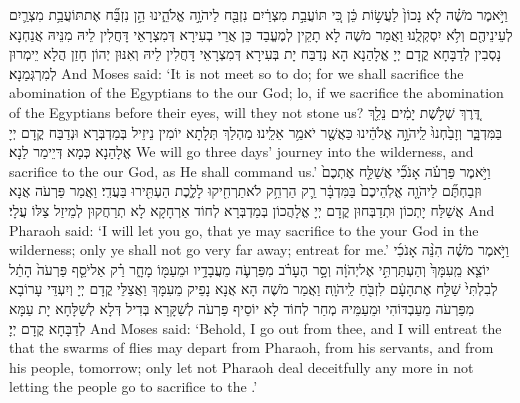 {וַיֹּ֣אמֶר מֹשֶׁ֗ה לֹ֤א נָכוֹן֙ לַעֲשׂ֣וֹת כֵּ֔ן כִּ֚י תּוֹעֲבַ֣ת מִצְרַ֔יִם נִזְבַּ֖ח לַיהֹוָ֣ה אֱלֹהֵ֑ינוּ הֵ֣ן נִזְבַּ֞ח אֶת\maqqaf תּוֹעֲבַ֥ת מִצְרַ֛יִם לְעֵינֵיהֶ֖ם וְלֹ֥א יִסְקְלֻֽנוּ׃}
{וַאֲמַר מֹשֶׁה לָא תָקֵין לְמֶעֱבַד כֵּן אֲרֵי בְעִירָא דְּמִצְרָאֵי דָּחֲלִין לֵיהּ מִנֵּיהּ אֲנַחְנָא נָסְבִין לְדַבָּחָא קֳדָם יְיָ אֱלָהַנָא הָא נְדַבַּח יָת בְּעִירָא דְּמִצְרָאֵי דָּחֲלִין לֵיהּ וְאִנּוּן יְהוֹן חָזַן הֲלָא יֵימְרוּן לְמִרְגְּמַנָא׃}
{And Moses said: ‘It is not meet so to do; for we shall sacrifice the abomination of the Egyptians to the \lord\space our God; lo, if we sacrifice the abomination of the Egyptians before their eyes, will they not stone us?}{}
{דֶּ֚רֶךְ שְׁלֹ֣שֶׁת יָמִ֔ים נֵלֵ֖ךְ בַּמִּדְבָּ֑ר וְזָבַ֙חְנוּ֙ לַֽיהֹוָ֣ה אֱלֹהֵ֔ינוּ כַּאֲשֶׁ֖ר יֹאמַ֥ר אֵלֵֽינוּ׃}
{מַהְלַךְ תְּלָתָא יוֹמִין נֵיזֵיל בְּמַדְבְּרָא וּנְדַבַּח קֳדָם יְיָ אֱלָהַנָא כְּמָא דְּיֵימַר לַנָא׃}
{We will go three days’ journey into the wilderness, and sacrifice to the \lord\space our God, as He shall command us.’}{}
{וַיֹּ֣אמֶר פַּרְעֹ֗ה אָנֹכִ֞י אֲשַׁלַּ֤ח אֶתְכֶם֙ וּזְבַחְתֶּ֞ם לַיהֹוָ֤ה אֱלֹֽהֵיכֶם֙ בַּמִּדְבָּ֔ר רַ֛ק הַרְחֵ֥ק לֹא\maqqaf תַרְחִ֖יקוּ לָלֶ֑כֶת הַעְתִּ֖ירוּ בַּעֲדִֽי׃}
{וַאֲמַר פַּרְעֹה אֲנָא אֲשַׁלַּח יָתְכוֹן וּתְדַבְּחוּן קֳדָם יְיָ אֱלָהֲכוֹן בְּמַדְבְּרָא לְחוֹד אַרְחָקָא לָא תְרַחֲקוּן לְמֵיזַל צַלּוֹ עֲלָי׃}
{And Pharaoh said: ‘I will let you go, that ye may sacrifice to the \lord\space your God in the wilderness; only ye shall not go very far away; entreat for me.’}{}
{וַיֹּ֣אמֶר מֹשֶׁ֗ה הִנֵּ֨ה אָנֹכִ֜י יוֹצֵ֤א מֵֽעִמָּךְ֙ וְהַעְתַּרְתִּ֣י אֶל\maqqaf יְהֹוָ֔ה וְסָ֣ר הֶעָרֹ֗ב מִפַּרְעֹ֛ה מֵעֲבָדָ֥יו וּמֵעַמּ֖וֹ מָחָ֑ר רַ֗ק אַל\maqqaf יֹסֵ֤ף פַּרְעֹה֙ הָתֵ֔ל לְבִלְתִּי֙ שַׁלַּ֣ח אֶת\maqqaf הָעָ֔ם לִזְבֹּ֖חַ לַֽיהֹוָֽה׃}
{וַאֲמַר מֹשֶׁה הָא אֲנָא נָפֵיק מֵעִמָּךְ וַאֲצַלֵּי קֳדָם יְיָ וְיִעְדֵּי עָרוֹבָא מִפַּרְעֹה מֵעַבְדּוֹהִי וּמֵעַמֵּיהּ מְחַר לְחוֹד לָא יוֹסֵיף פַּרְעֹה לְשַׁקָּרָא בְּדִיל דְּלָא לְשַׁלָּחָא יָת עַמָּא לְדַבָּחָא קֳדָם יְיָ׃}
{And Moses said: ‘Behold, I go out from thee, and I will entreat the \lord\space that the swarms of flies may depart from Pharaoh, from his servants, and from his people, tomorrow; only let not Pharaoh deal deceitfully any more in not letting the people go to sacrifice to the \lord.’}{}
